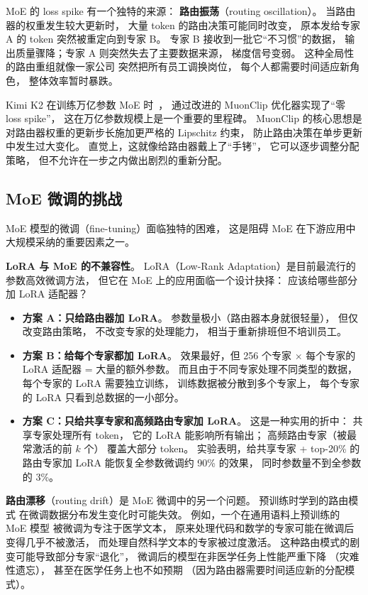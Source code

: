 MoE 的 loss spike 有一个独特的来源：
\textbf{路由振荡}（routing oscillation）。
当路由器的权重发生较大更新时，
大量 token 的路由决策可能同时改变，
原本发给专家 A 的 token 突然被重定向到专家 B。
专家 B 接收到一批它“不习惯”的数据，
输出质量骤降；专家 A 则突然失去了主要数据来源，
梯度信号变弱。
这种全局性的路由重组就像一家公司
突然把所有员工调换岗位，
每个人都需要时间适应新角色，
整体效率暂时暴跌。

Kimi K2 在训练万亿参数 MoE 时~\cite{kimiTeam2025kimik2}，
通过改进的 MuonClip 优化器实现了“零 loss spike”，
这在万亿参数规模上是一个重要的里程碑。
MuonClip 的核心思想是
对路由器权重的更新步长施加更严格的 Lipschitz 约束，
防止路由决策在单步更新中发生过大变化。
直觉上，这就像给路由器戴上了“手铐”，
它可以逐步调整分配策略，
但不允许在一步之内做出剧烈的重新分配。

\subsection{MoE 微调的挑战}

MoE 模型的微调（fine-tuning）面临独特的困难，
这是阻碍 MoE 在下游应用中大规模采纳的重要因素之一。

\textbf{LoRA 与 MoE 的不兼容性}。
LoRA（Low-Rank Adaptation）是目前最流行的参数高效微调方法，
但它在 MoE 上的应用面临一个设计抉择：
应该给哪些部分加 LoRA 适配器？

\begin{itemize}[noitemsep]
  \item \textbf{方案 A：只给路由器加 LoRA}。
        参数量极小（路由器本身就很轻量），
        但仅改变路由策略，
        不改变专家的处理能力，
        相当于重新排班但不培训员工。
  \item \textbf{方案 B：给每个专家都加 LoRA}。
        效果最好，但 256 个专家 $\times$ 每个专家的 LoRA 适配器
        = 大量的额外参数。
        而且由于不同专家处理不同类型的数据，
        每个专家的 LoRA 需要独立训练，
        训练数据被分散到多个专家上，
        每个专家的 LoRA 只看到总数据的一小部分。
  \item \textbf{方案 C：只给共享专家和高频路由专家加 LoRA}。
        这是一种实用的折中：
        共享专家处理所有 token，
        它的 LoRA 能影响所有输出；
        高频路由专家（被最常激活的前 $k$ 个）
        覆盖大部分 token。
        实验表明，给共享专家 + top-20\% 的路由专家加 LoRA
        能恢复全参数微调约 90\% 的效果，
        同时参数量不到全参数的 3\%。
\end{itemize}

\textbf{路由漂移}（routing drift）是 MoE 微调中的另一个问题。
预训练时学到的路由模式
在微调数据分布发生变化时可能失效。
例如，一个在通用语料上预训练的 MoE 模型
被微调为专注于医学文本，
原来处理代码和数学的专家可能在微调后变得几乎不被激活，
而处理自然科学文本的专家被过度激活。
这种路由模式的剧变可能导致部分专家“退化”，
微调后的模型在非医学任务上性能严重下降
（灾难性遗忘），
甚至在医学任务上也不如预期
（因为路由器需要时间适应新的分配模式）。

